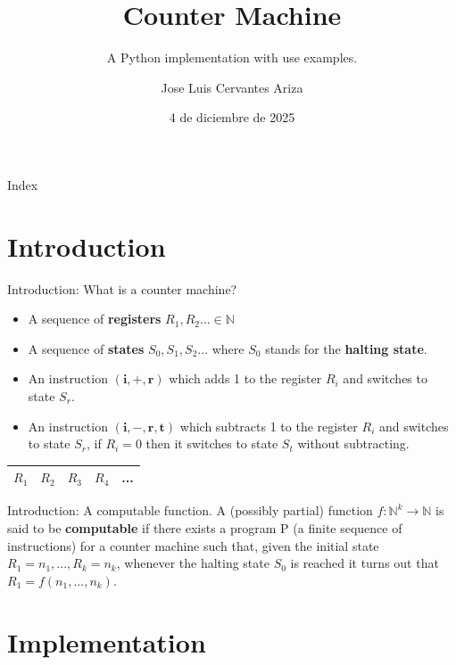 \documentclass[aspectratio=169]{beamer}
\title{Counter Machine}
\subtitle{A Python implementation with use examples.}
\author{Jose Luis Cervantes Ariza}
\institute{Universidad de Málaga}
\date{4 de diciembre de 2025}
\begin{document}
\begin{frame}
    \titlepage
\end{frame}

\begin{frame}{Index}
    \tableofcontents
\end{frame}

\section{Introduction}

\begin{frame}{Introduction: What is a counter machine?}
    \begin{itemize}
        \item A sequence of \textbf{registers} ${R_1,R_2 ... \in \mathbb{N}}$
        \item A sequence of \textbf{states} ${S_0,S_1,S_2...}$ where $S_0$ stands for the \textbf{halting state}. 
        \item An instruction $\mathbf{(i,+,r)}$ which adds 1 to the register $R_i$ and switches to state $S_r$.
        \item An instruction $\mathbf{(i,-,r,t)}$ which subtracts 1 to the register $R_i$ and switches to state $S_r$, if $R_i=0$ then it switches to state $S_t$ without subtracting.
    \end{itemize}
\begin{center}
    \begin{tabular}{|c|c|c|c|c|}
        \hline
        $R_1$ & $R_2$ & $R_3$ & $R_4$ & ... \\
        \hline
    \end{tabular}
\end{center}
\end{frame}

\begin{frame}{Introduction: A computable function.}
    A (possibly partial) function $f:\mathbb{N}^{k}\rightarrow\mathbb{N}$ is said to be \textbf{computable} if there exists
    a program P (a finite sequence of instructions) for a counter machine such that, given the initial state
    $R_1 = n_1,...,R_k = n_k$, whenever the halting state $S_0$ is reached it turns out that $R_1 = f(n_1,...,n_k)$.
    
\end{frame}


\section{Implementation}
\end{document}
